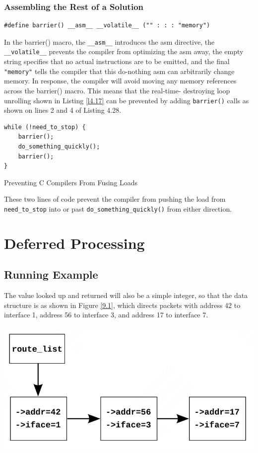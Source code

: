\documentclass[11pt]{article}
\begin{document}
\subsubsection{Assembling the Rest of a Solution}
\label{sec:orgd3413f7}
\begin{verbatim}
#define barrier() __asm__ __volatile__ ("" : : : "memory")
\end{verbatim}
In the barrier() macro, the \texttt{\_\_asm\_\_} introduces the asm directive, the \texttt{\_\_volatile\_\_} prevents the
compiler from optimizing the asm away, the empty string specifies that no actual instructions are to
be emitted, and the final \texttt{"memory"} tells the compiler that this do-nothing asm can arbitrarily change
memory. In response, the compiler will avoid moving any memory references across the barrier() macro.
This means that the real-time- destroying loop unrolling shown in Listing \ref{l4.17} can be prevented
by adding \texttt{barrier()} calls as shown on lines 2 and 4 of Listing 4.28.
\begin{listing}[htbp]
\begin{verbatim}
while (!need_to_stop) {
    barrier();
    do_something_quickly();
    barrier();
}
\end{verbatim}
\caption{\label{l4.28}Preventing C Compilers From Fusing Loads}
\end{listing}
These two lines of code prevent the compiler from pushing the load from \texttt{need\_to\_stop} into or past
\texttt{do\_something\_quickly()} from either direction.
\section{Deferred Processing}
\label{sec:orgf95fa00}
\subsection{Running Example}
\label{sec:org2841363}
The value looked up and returned will also be a simple integer, so that the data structure is as shown
in Figure \ref{9.1}, which directs packets with address 42 to interface 1, address 56 to interface 3,
and address 17 to interface 7.

\begin{center}
\includegraphics[width=.99\textwidth]{../images/perfbook/3.png}
\end{center}
\end{document}
